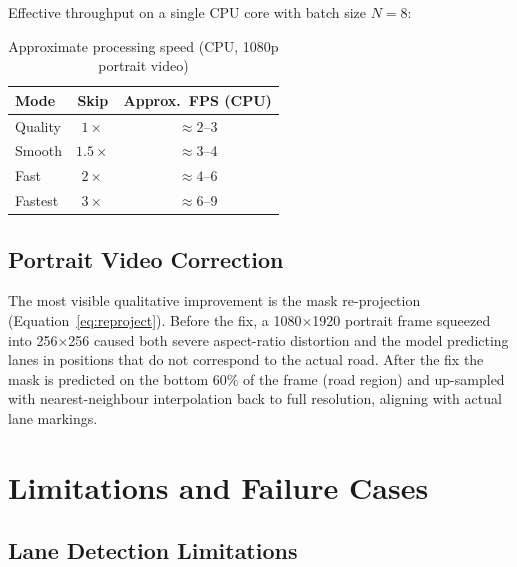 \documentclass[12pt, a4paper]{article}
\begin{document}
Effective throughput on a single CPU core with batch size $N=8$:

\begin{table}[H]
  \centering
  \caption{Approximate processing speed (CPU, 1080p portrait video)}
  \begin{tabular}{lcc}
    \toprule
    \textbf{Mode} & \textbf{Skip} & \textbf{Approx.\ FPS (CPU)} \\
    \midrule
    Quality  & $1\times$   & $\approx 2$--3  \\
    Smooth   & $1.5\times$ & $\approx 3$--4  \\
    Fast     & $2\times$   & $\approx 4$--6  \\
    Fastest  & $3\times$   & $\approx 6$--9  \\
    \bottomrule
  \end{tabular}
  \label{tab:speed}
\end{table}

\subsection{Portrait Video Correction}

The most visible qualitative improvement is the mask re-projection
(Equation~\ref{eq:reproject}). Before the fix, a 1080$\times$1920
portrait frame squeezed into 256$\times$256 caused both severe
aspect-ratio distortion and the model predicting lanes in positions
that do not correspond to the actual road. After the fix the mask
is predicted on the bottom $60\%$ of the frame (road region) and
up-sampled with nearest-neighbour interpolation back to full resolution,
aligning with actual lane markings.

\section{Limitations and Failure Cases}

\subsection{Lane Detection Limitations}
\end{document}

